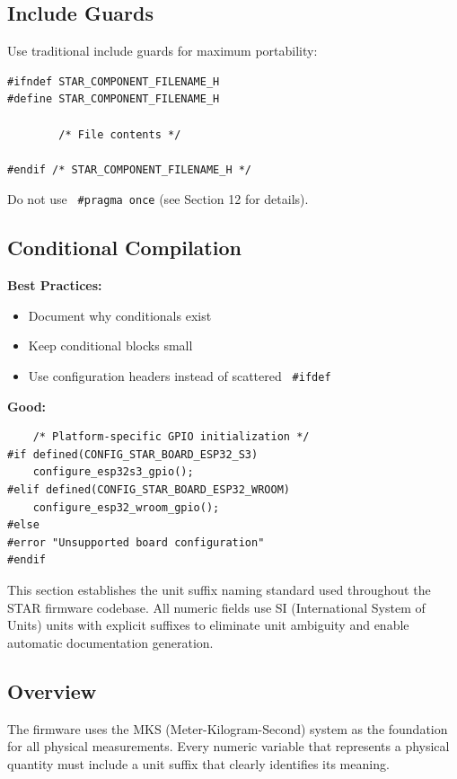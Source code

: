 \subsection{Include Guards}

Use traditional include guards for maximum portability:

\begin{verbatim}
#ifndef STAR_COMPONENT_FILENAME_H
#define STAR_COMPONENT_FILENAME_H

        /* File contents */

#endif /* STAR_COMPONENT_FILENAME_H */
\end{verbatim}

Do not use \texttt{
      \#pragma once} (see Section 12 for details).

\subsection{Conditional Compilation}

\textbf{Best Practices:}
\begin{itemize}
    \item Document why conditionals exist
    \item Keep conditional blocks small
    \item Use configuration headers instead of scattered \texttt{
      \#ifdef}
\end{itemize}

\textbf{Good:}
\begin{verbatim}
    /* Platform-specific GPIO initialization */
#if defined(CONFIG_STAR_BOARD_ESP32_S3)
    configure_esp32s3_gpio();
#elif defined(CONFIG_STAR_BOARD_ESP32_WROOM)
    configure_esp32_wroom_gpio();
#else
#error "Unsupported board configuration"
#endif
\end{verbatim}


This section establishes the unit suffix naming standard used throughout the STAR firmware codebase. All numeric fields use SI (International System of Units) units with explicit suffixes to eliminate unit ambiguity and enable automatic documentation generation.

\subsection{Overview}

The firmware uses the MKS (Meter-Kilogram-Second) system as the foundation for all physical measurements. Every numeric variable that represents a physical quantity must include a unit suffix that clearly identifies its meaning.

